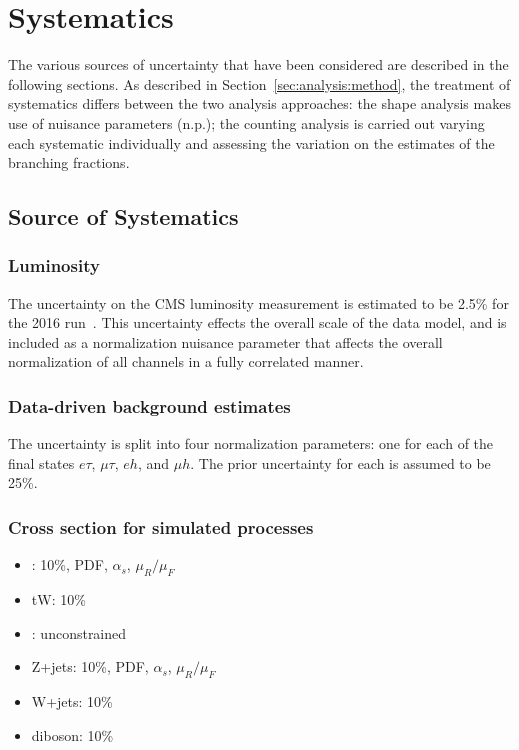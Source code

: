 \section{Systematics}
\label{sec:analysis:systematics}


The various sources of uncertainty that have been considered are
described in the following sections. As described in Section~\ref{sec:analysis:method}, 
the treatment of systematics
differs between the two analysis approaches: the shape analysis makes
use of nuisance parameters (n.p.);
the counting analysis is carried out varying each systematic
individually and assessing the variation on the estimates of the
branching fractions.


\subsection{Source of Systematics}
\subsubsection{Luminosity} 
        
The uncertainty on the CMS luminosity measurement is estimated to be
2.5\% for the 2016 run~\cite{CMS-PAS-LUM-17-001}.  This uncertainty
effects the overall scale of the data model, and is included as a
normalization nuisance parameter that affects the overall normalization of all
channels in a fully correlated manner.


\subsubsection{Data-driven background estimates}

The uncertainty is split into four normalization parameters: one for
each of the final states $e\tau$, $\mu\tau$, $eh$, and $\mu h$.  The
prior uncertainty for each is assumed to be 25\%.

\subsubsection{Cross section for simulated processes}

\begin{itemize}
    \item \ttbar: 10\%, PDF, $\alpha_{s}$, $\mu_{R}/\mu_{F}$
    \item tW: 10\%
    \item \WW: unconstrained
    \item Z+jets: 10\%, PDF, $\alpha_{s}$, $\mu_{R}/\mu_{F}$
    \item W+jets: 10\%
    \item diboson: 10\%
\end{itemize}

